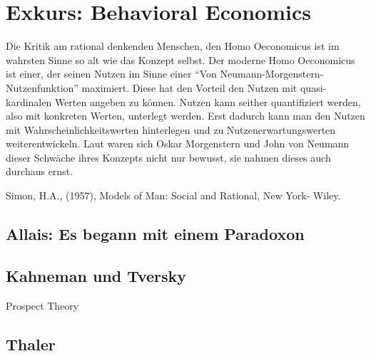 %
%
%

\chapter{Exkurs: Behavioral Economics}
\label{Behavioral}


Die Kritik am rational denkenden Menschen, den Homo Oeconomicus ist im wahrsten Sinne so alt wie das Konzept selbst. Der moderne Homo Oeconomicus ist einer, der seinen Nutzen im Sinne einer "`Von Neumann-Morgenstern-Nutzenfunktion"' \parencite{VonNeumann1944} maximiert. Diese hat den Vorteil den Nutzen mit quasi-kardinalen Werten angeben zu können. Nutzen kann seither quantifiziert werden, also mit konkreten Werten, unterlegt werden. Erst dadurch kann man den Nutzen mit Wahrscheinlichkeitswerten hinterlegen und zu Nutzenerwartungswerten weiterentwickeln. Laut \textcite[S. 3]{Selten2001} waren sich Oskar Morgenstern und John von Neumann dieser Schwäche ihres Konzepts nicht nur bewusst, sie nahmen dieses auch durchaus ernst.


Simon, H.A., (1957), Models of Man: Social and Rational, New York- Wiley.

\section{Allais: Es begann mit einem Paradoxon}

\section{Kahneman und Tversky}
Prospect Theory

\section{Thaler}
